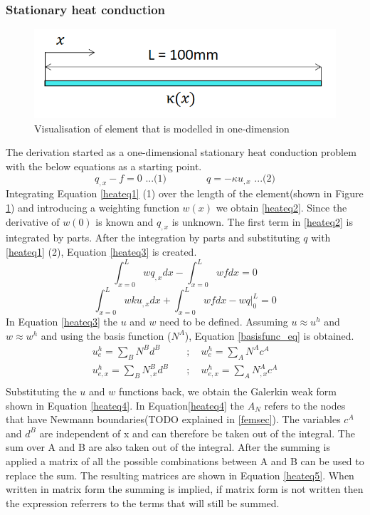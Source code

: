 	\subsubsection{Stationary heat conduction}
	\begin{figure}[H]
	\label{femfig}
	\centering
	\includegraphics[width = 0.75\linewidth]{figures/fem_sketch.png}
	\caption{Visualisation of element that is modelled in one-dimension}
	\end{figure}
	The derivation started as a one-dimensional stationary heat conduction problem with the below equations as a starting point.
	\begin{equation}
	\label{heateq1}
	q_{,x}-f = 0  \text{  ...(1)} \quad\quad\quad\quad q = -\kappa u_{,x} \text{  ...(2)} 
	\end{equation}
	Integrating Equation \ref{heateq1} (1) over the length of the element(shown in Figure \ref{femfig}) and introducing a weighting function $w(x)$ we obtain \ref{heateq2}. 
	Since the derivative of $w(0)$ is known and $q_{,x}$ is unknown. 
	The first term in \ref{heateq2} is integrated by parts. 
	After the integration by parts and substituting $q$ with \ref{heateq1} (2), Equation \ref{heateq3} is created.
	\begin{equation}
	\label{heateq2}
	\int_{x=0}^L wq_{,x}dx - \int_{x=0}^L wfdx = 0
	\end{equation}
	\begin{equation}
	\label{heateq3}
	\int_{x=0}^L wku_{,x}dx + \int_{x=0}^L wfdx - \left.wq\right|_0^L = 0
	\end{equation}
	In Equation \ref{heateq3} the $u$ and $w$ need to be defined.
	Assuming $u \approx u^h$ and $w \approx w^h$ and using the basis function ($N^A$), Equation \ref{basisfunc_eq} is obtained.
	\begin{equation}
	\label{basisfunc_eq}
	\begin{aligned}
	u_e^h = \sum_{B} N^B d^B  \quad &;\quad w_e^h = \sum_{A} N^A c^A\\
	u_{e,x}^h = \sum_{B} N_{,x}^B d^B \quad &;\quad w_{e,x}^h=\sum_A N_{,x}^A c^A\\
	\end{aligned}
	\end{equation}		
	Substituting the $u$ and $w$ functions back, we obtain the Galerkin weak form shown in Equation \ref{heateq4}.
	In Equation\ref{heateq4} the $A_N$ refers to the nodes that have Newmann boundaries(TODO explained in \ref{femsec}). 
	The variables $c^A$ and $d^B$ are independent of x and can therefore be taken out of the integral. 
	The sum over A and B are also taken out of the integral.
	After the summing is applied a matrix of all the possible combinations between A and B can be used to replace the sum. The resulting matrices are shown in Equation \ref{heateq5}. 
	When written in matrix form the summing is implied, if matrix form is not written then the expression referrers to the terms that will still be summed.

